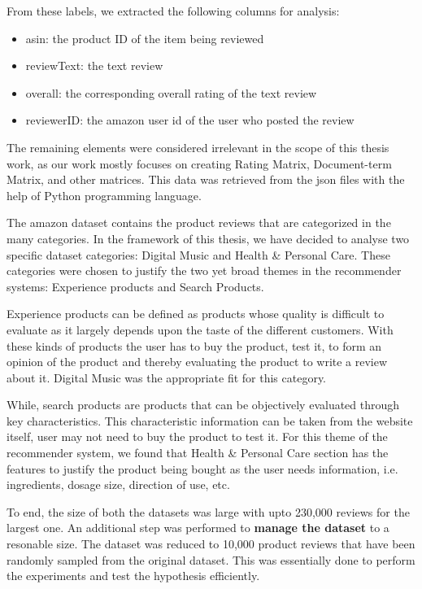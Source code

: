 From these labels, we extracted the following columns for analysis:
\begin{itemize}
	\item asin: the product ID of the item being reviewed
	\item reviewText: the text review
	\item overall: the corresponding overall rating of the text review
	\item reviewerID: the amazon user id of the user who posted the review
\end{itemize}

The remaining elements were considered irrelevant in the scope of this thesis work, as our work mostly focuses on creating Rating Matrix, Document-term Matrix, and other matrices. This data was retrieved from the json files with the help of Python programming language.

The amazon dataset contains the product reviews that are categorized in the many categories. In the framework of this thesis, we have decided to analyse two specific dataset categories: Digital Music and Health \& Personal Care. These categories were chosen to justify the two yet broad themes in the recommender systems: Experience products and Search Products. 

Experience products can be defined as products whose quality is difficult to evaluate as it largely depends upon the taste of the different customers. With these kinds of products the user has to buy the product, test it, to form an opinion of the product and thereby evaluating the product to write a review about it. Digital Music was the appropriate fit for this category.

While, search products are products that can be objectively evaluated through key characteristics. This characteristic information can be taken from the website itself, user may not need to buy the product to test it. For this theme of the recommender system, we found that Health \& Personal Care section has the features to justify the product being bought as the user needs information, i.e. ingredients, dosage size, direction of use, etc.

To end, the size of both the datasets was large with upto 230,000 reviews for the largest one. An additional step was performed to \textbf{manage the dataset} to a resonable size. The dataset was reduced to 10,000 product reviews that have been randomly sampled from the original dataset. This was essentially done to perform the experiments and test the hypothesis efficiently.




